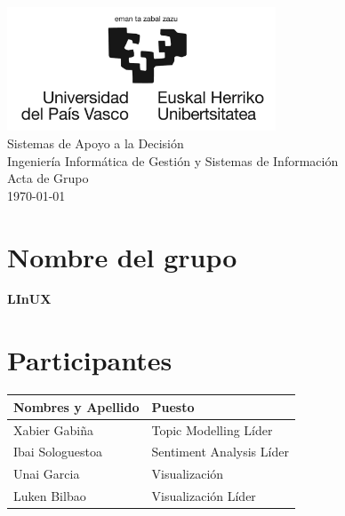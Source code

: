 \documentclass{report}
\begin{document}
    \begin{titlepage}
        \centering
        \includegraphics[width=0.6\textwidth]{./img/logo.jpg}\\
        \vspace{1cm}
        \LARGE Sistemas de Apoyo a la Decisión\\
        \vspace{0.5cm}
        \Large Ingeniería Informática de Gestión y Sistemas de Información\\
        \vspace{3cm}
        \Huge Acta de Grupo\\
        \vspace{2.5cm}
        \vfill
        \large
        \today
    \end{titlepage}
    \section*{Nombre del grupo}

    \textbf{LInUX}

    \section*{Participantes}
    \begin{center}
        \begin{longtable}{|p{6cm}|p{6cm}|}
            \hline
            \textbf{Nombres y Apellido} & \textbf{Puesto}\\
            \hline
            Xabier Gabiña & Topic Modelling Líder\\
            \hline
            Ibai Sologuestoa & Sentiment Analysis Líder\\
            \hline
            Unai Garcia & Visualización\\
            \hline
            Luken Bilbao & Visualización Líder\\
            \hline
        \end{longtable}
    \end{center}
\end{document}
